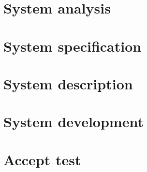 



\frontmatter
% 
\cleardoublepage
%
%

\mainmatter
\cleardoublepage
\tableofcontents
\clearpage

%



\chapter{System analysis}






\chapter{System specification}


\chapter{System description}


\chapter{System development}






\chapter{Accept test}



\clearpage



\appendix
\appendixtocname
\addappheadtotoc


